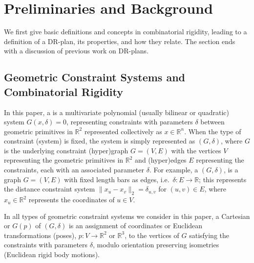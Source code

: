 \section{Preliminaries and Background}
\label{sec:prelim}


We first give basic definitions and concepts in combinatorial rigidity, leading to a definition of a DR-plan, its properties, and how they relate. The section ends with a discussion of previous work on DR-plans.

\subsection{Geometric Constraint Systems and Combinatorial Rigidity}
\label{sec:prelim:defs}
\label{sec:appendix:defs}


In this paper, a  is a multivariate polynomial (usually bilinear or quadratic) system $G(x,\delta)=0$, representing constraints with parameters $\delta$ between geometric primitives  in $\mathbb{R}^2$ represented collectively as $x\in \mathbb{R}^n$.
%
When the type of constraint (system) is fixed, the system is simply represented as $(G,\delta)$, where $G$ is the underlying constraint (hyper)graph $G = (V,E)$ with the vertices $V$ representing the geometric primitives in $\mathbb{R}^2$ and (hyper)edges $E$ representing the constraints, each with an associated parameter $\delta$.
%
For example, a  $(G,\delta)$, is a graph $G=(V,E)$ with fixed length bars as edges,
i.e.\ $\delta: E \rightarrow \mathbb{R}$; this represents the distance constraint system $\| x_u -x_v \|_2 = \delta_{u,v}$ for  $(u,v) \in E$, where $x_u \in \mathbb{R}^2$ represents the coordinates of $u\in V$.



In all types of geometric constraint systems we consider in this paper, a Cartesian  or  $G(p)$ of $(G,\delta)$ is an assignment of coordinates or Euclidean transformations (poses), $p: V \rightarrow \mathbb{R}^2$ or $\mathbb{R}^3$, to the vertices of $G$ satisfying the constraints with parameters $\delta$, modulo orientation preserving isometries (Euclidean rigid body motions).

